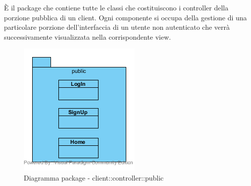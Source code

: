 È il package che contiene tutte le classi che costituiscono i controller della porzione pubblica di un client. Ogni componente si occupa della gestione di una particolare porzione dell'interfaccia di un utente non autenticato che verrà successivamente visualizzata nella corrispondente view.\begin{center}
	\begin{figure}[H]
		\centering \includegraphics[scale=4, max width=\textwidth, max height=\myheight]{../img/diagrammiClassi/client/controller/public.png}
		\caption{Diagramma package - client::controller::public}
	\end{figure}
\end{center}\hypertarget{client::controller::public::LogIn}{}

